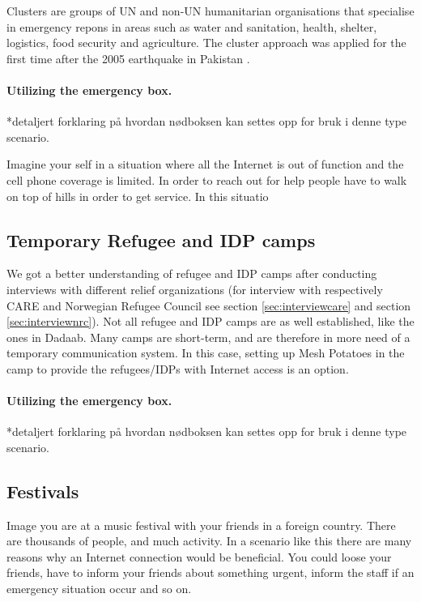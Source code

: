 Clusters are groups of UN and non-UN humanitarian organisations that specialise in emergency repons in areas such as water and sanitation, health, shelter, logistics, food security and agriculture. The cluster approach was applied for the first time after the 2005 earthquake in Pakistan \cite{disasterResponse}.


\paragraph{Utilizing the emergency box.}
*detaljert forklaring på hvordan nødboksen kan settes opp for bruk i denne type scenario. 

Imagine your self in a situation where all the Internet is out of function and the cell phone coverage is limited. In order to reach out for help people have to walk on top of hills in order to get service. 
In this situatio


\subsection{Temporary Refugee and IDP camps}
We got a better understanding of refugee and IDP camps after conducting interviews with different relief organizations (for interview with respectively CARE and Norwegian Refugee Council see section \ref{sec:interviewcare} and section \ref{sec:interviewnrc}). 
Not all refugee and IDP camps are as well established, like the ones in Dadaab. Many camps are short-term, and are therefore in more need of a temporary communication system. In this case, setting up Mesh Potatoes in the camp to provide the refugees/IDPs with Internet access is an option. 

\paragraph{Utilizing the emergency box.}
*detaljert forklaring på hvordan nødboksen kan settes opp for bruk i denne type scenario. 

\subsection{Festivals}
Image you are at a music festival with your friends in a foreign country. There are thousands of people, and much activity. In a scenario like this there are many reasons why an Internet connection would be beneficial. You could loose your friends, have to inform your friends about something urgent, inform the staff if an emergency situation occur and so on. 

